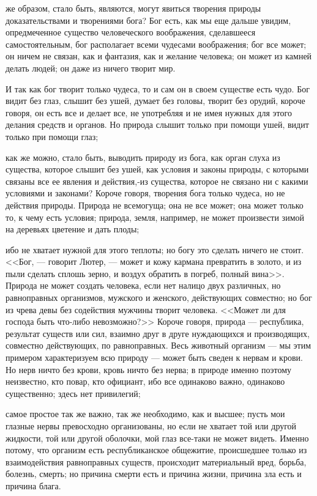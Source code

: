\documentclass[12pt]{article}
\begin{document}
же образом, стало быть, являются, могут явиться творения природы доказательствами и творениями бога? Бог есть, как мы еще дальше увидим, опредмеченное существо человеческого воображения, сделавшееся самостоятельным, бог располагает всеми чудесами воображения; бог все может; он ничем не связан, как и фантазия, как и желание человека; он может из камней делать людей; он даже из ничего творит мир. 

И так как бог творит только чудеса, то и сам он в своем существе есть чудо. Бог видит без глаз, слышит без ушей, думает без головы, творит без орудий, короче говоря, он есть все и делает все, не употребляя и не имея нужных для этого делания средств и органов. Но природа слышит только при помощи ушей, видит только при помощи глаз; 

как же можно, стало быть, выводить природу из бога, как орган слуха из существа, которое слышит без ушей, как условия и законы природы, с которыми связаны все ее явления и действия,-из существа, которое не связано ни с какими условиями и законами? Короче говоря, творения бога только чудеса, но не действия природы. Природа не всемогуща; она не все может; она может только то, к чему есть условия; природа, земля, например, не может произвести зимой на деревьях цветение и дать плоды; 

ибо не хватает нужной для этого теплоты; но богу это сделать ничего не стоит. <<Бог, --- говорит Лютер, --- может и кожу кармана превратить в золото, и из пыли сделать сплошь зерно, и воздух обратить в погреб, полный вина>>. Природа не может создать человека, если нет налицо двух различных, но равноправных организмов, мужского и женского, действующих совместно; но бог из чрева девы без содействия мужчины творит человека. <<Может ли для господа быть что-либо невозможно?>> Короче говоря, природа --- республика, результат существ или сил, взаимно друг в друге нуждающихся и производящих, совместно действующих, по равноправных. Весь животный организм --- мы этим примером характеризуем всю природу --- может быть сведен к нервам и крови. Но нерв ничто без крови, кровь ничто без нерва; в природе именно поэтому неизвестно, кто повар, кто официант, ибо все одинаково важно, одинаково существенно; здесь нет привилегий; 

самое простое так же важно, так же необходимо, как и высшее; пусть мои глазные нервы превосходно организованы, но если не хватает той или другой жидкости, той или другой оболочки, мой глаз все-таки не может видеть. Именно потому, что организм есть республиканское общежитие, происшедшее только из взаимодействия равноправных существ, происходит материальный вред, борьба, болезнь, смерть; но причина смерти есть и причина жизни, причина зла есть и причина блага. 
\end{document}
